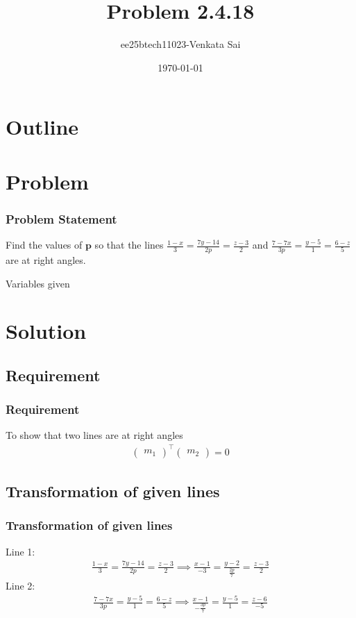 \documentclass{beamer}
\title{Problem 2.4.18}
\author{ee25btech11023-Venkata Sai}
\date{\today}
\theoremstyle{remark}
\newcommand{\myvec}[1]{\ensuremath{\begin{pmatrix}#1\end{pmatrix}}}
\let\vec\mathbf
\numberwithin{equation}{section}
\begin{document}
\begin{frame}
\titlepage
\end{frame}

\section*{Outline}
\begin{frame}
\tableofcontents
\end{frame}
\section{Problem}
\begin{frame}
\frametitle{Problem Statement}
%
Find the values of $\vec{p}$ so that the lines $\frac{1-x}{3} = \frac{7y-14}{2p} = \frac{z-3}{2}$ and $\frac{7-7x}{3p} = \frac{y-5}{1} = \frac{6-z}{5}$ are at right angles. 
 \begin{table}[h!]    
  \centering
  
  \caption{Variables given}
  \label{tab 1.4.9.2}
\end{table}
\end{frame}

\section{Solution}
\subsection{Requirement}
\begin{frame}
\frametitle{Requirement}
To show that two lines are at right angles
\begin{align}
 \myvec{m_1}^\top\myvec{m_2} = 0 
\end{align}

\end{frame}
\subsection{Transformation of given lines}
\begin{frame}
\frametitle{Transformation of given lines}
Line 1:
\begin{align}
\frac{1-x}{3} = \frac{7y-14}{2p} = \frac{z-3}{2} \implies \frac{x-1}{-3} = \frac{y-2}{\frac{2p}{7}} = \frac{z-3}{2}
\end{align}
Line 2:
\begin{align}
\frac{7-7x}{3p} = \frac{y-5}{1} = \frac{6-z}{5} \implies \frac{x-1}{-\frac{3p}{7}} = \frac{y-5}{1} = \frac{z-6}{-5}
\end{align}
\end{frame}
\end{document}
